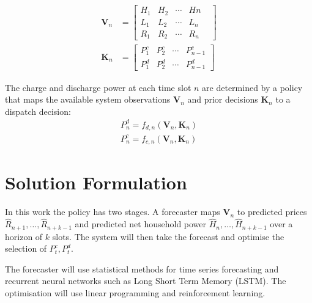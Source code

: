 \begin{subequations}
    \begin{align}
        \textbf{V}_n &= \begin{bmatrix}
            H_1 & H_2 & \cdots & H{n}\\
            L_{1} & L_2 & \cdots & L_{n} & \\
            R_{1} & R_2 & \cdots & R_{n}
        \end{bmatrix} \label{eq:sysknowledge:state}  \\
        \textbf{K}_n &= \begin{bmatrix}
            P^c_{1} & P^c_{2} & \cdots & P^c_{n-1} \\
            P^d_{1} & P^d_{2} & \cdots & P^d_{n-1}
        \end{bmatrix} \label{eq:sysknowledge:decision}
    \end{align}
\end{subequations}

The charge and discharge power at each time slot $n$ are determined by a policy
that maps the available system observations $\textbf{V}_n$ and prior decisions
$\textbf{K}_n$ to a dispatch decision:
\begin{subequations}
    \begin{align}
        P^d_n = f_{d,n} (\textbf{V}_n,\textbf{K}_n) \\
        P^c_n = f_{c,n} (\textbf{V}_n,\textbf{K}_n)
    \end{align}
\end{subequations}

\section{Solution Formulation}

In this work the policy has two stages. A forecaster maps $\textbf{V}_n$ to predicted prices $\hat{R}_{n+1},\dots,\hat{R}_{n+k-1}$ and predicted net household power $\hat{H}_{n},\dots,\hat{H}_{n+k-1}$ over a horizon of $k$ slots. The system will then take the forecast and optimise the selection of $P^c_t,P^d_t$.

The forecaster will use statistical methods for time series forecasting and recurrent neural networks such as Long Short Term Memory (LSTM). The optimisation will use linear programming and reinforcement learning. 

 
